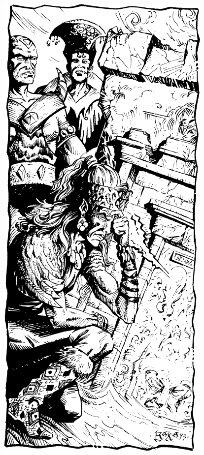 \begin{figure}[b!]
\centering
\includegraphics[width=\columnwidth]{images/cleric-4.png}
\WOTC
\end{figure}
